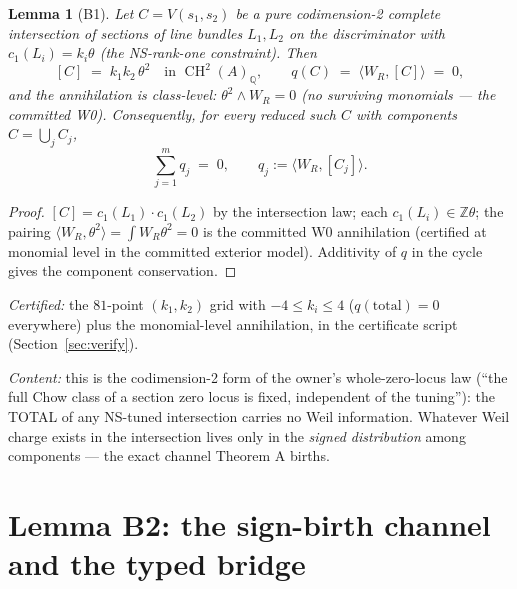 \documentclass[11pt]{article}
\newtheorem{lemma}{Lemma}[section]
\newcommand{\WR}{W_R}
\newcommand{\KA}{A}
\newcommand{\CH}{\operatorname{CH}}
\begin{document}
\begin{lemma}[B1]
Let $C = V(s_1, s_2)$ be a pure codimension-2 complete intersection of
sections of line bundles $L_1, L_2$ on the discriminator with
$c_1(L_i) = k_i\theta$ (the NS-rank-one constraint). Then
\[
[C] \;=\; k_1 k_2\, \theta^2 \quad\text{in } \CH^2(\KA)_{\mathbb Q},
\qquad q(C) \;=\; \langle \WR, [C]\rangle \;=\; 0,
\]
and the annihilation is class-level: $\theta^2 \wedge \WR = 0$ (no surviving
monomials --- the committed W0). Consequently, for every reduced such $C$ with
components $C = \bigcup_j C_j$,
\[
\sum_{j=1}^m q_j \;=\; 0, \qquad q_j := \langle \WR, [C_j]\rangle.
\]
\end{lemma}

\begin{proof}
$[C] = c_1(L_1)\cdot c_1(L_2)$ by the intersection law; each
$c_1(L_i) \in \mathbb Z\theta$; the pairing $\langle \WR, \theta^2\rangle
= \int \WR \theta^2 = 0$ is the committed W0 annihilation (certified at
monomial level in the committed exterior model). Additivity of $q$ in the
cycle gives the component conservation.
\end{proof}

\emph{Certified:} the $81$-point $(k_1,k_2)$ grid with $-4 \le k_i \le 4$
($q(\text{total}) = 0$ everywhere) plus the monomial-level annihilation, in
the certificate script (Section~\ref{sec:verify}).

\emph{Content:} this is the codimension-2 form of the owner's whole-zero-locus
law (``the full Chow class of a section zero locus is fixed, independent of
the tuning''): the TOTAL of any NS-tuned intersection carries no Weil
information. Whatever Weil charge exists in the intersection lives only in
the \emph{signed distribution} among components --- the exact channel
Theorem A births.

\section{Lemma B2: the sign-birth channel and the typed bridge}
\end{document}
